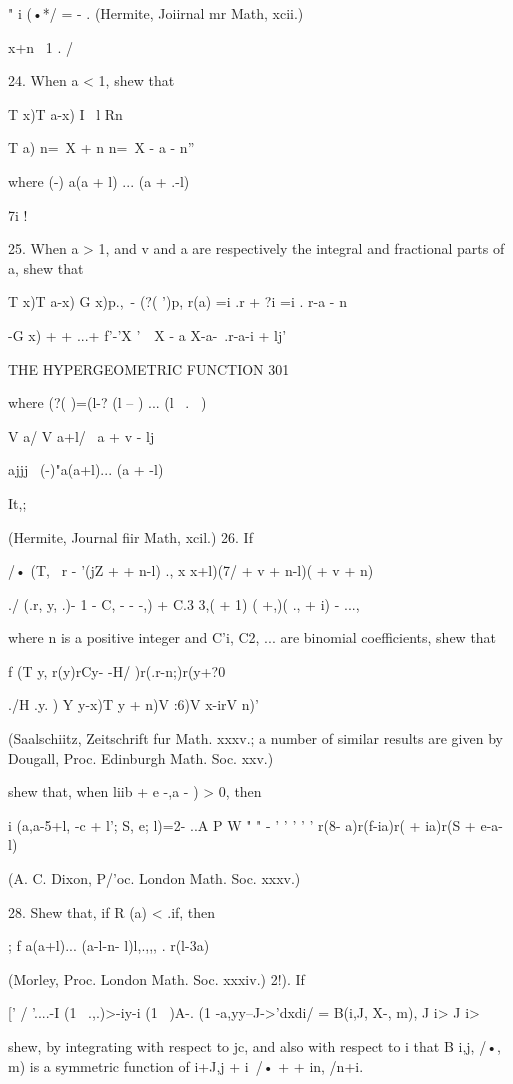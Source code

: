 " i (•*/ = - . (Hermite, Joiirnal mr Math, xcii.)

x+n \ 1 . /

24. When a < 1, shew that

T x)T a-x) I \ l Rn

T a) n=\ X + n n=\ X - a - n''

where (-) a(a + l) ... (a + .-l)

7i !

25. When a > 1, and v and a are respectively the integral and
fractional parts of a, shew that

T x)T a-x) G x)p.,\ - (?( ')p, r(a) =i .r + ?i =i . r-a - n

-G x) + + ...+ f'-'X '\ \ X - a X-a-\ .r-a-i + lj'

THE HYPERGEOMETRIC FUNCTION 301

where (?( )=(l-? (l -- ) ... (l \ . \ )

V a/ V a+l/ \ a + v - lj

ajjj \ (-)"a(a+l)... (a + -l)

It,;

(Hermite, Journal fiir Math, xcil.) 26. If

/• (T, \ r - '(jZ + + n-l) ., x x+l)(7/ + v + n-l)( + v + n)

./ (.r, y, .)- 1 - C, - - -,) + C.3 3,( + 1) ( +,)( ., + i) - ...,

where n is a positive integer and C'i, C2, ... are binomial
coefficients, shew that

f (T y, r(y)rCy- -H/ )r(.r-n;)r(y+?0

./H .y. ) Y y-x)T y + n)V :6)V x-irV n)'

(Saalschiitz, Zeitschrift fur Math. xxxv.; a number of similar
results are given by Dougall, Proc. Edinburgh Math. Soc. xxv.)

shew that, when liib + e -,a - ) > 0, then

i (a,a-5+l, -c + l'; S, e; l)=2- ..A P W " " - ' ' ' ' ' r(8-
a)r(f-ia)r( + ia)r(S + e-a-l)

(A. C. Dixon, P/'oc. London Math. Soc. xxxv.)

28. Shew that, if R (a) < .if, then

; f a(a+l)... (a-l-n- l)l,.,,, . r(l-3a)

(Morley, Proc. London Math. Soc. xxxiv.) 2!). If

[' / '....-I (1 \ .,.)>-iy-i (1 \ )A-. (1 -a,yy--J->'dxdi/ = B(i,J,
X-, m), J i> J i>

shew, by integrating with respect to jc, and also with respect to i
that B i,j, /•, m) is a symmetric function of i+J,j + i\ /• + + in,
/n+i.

